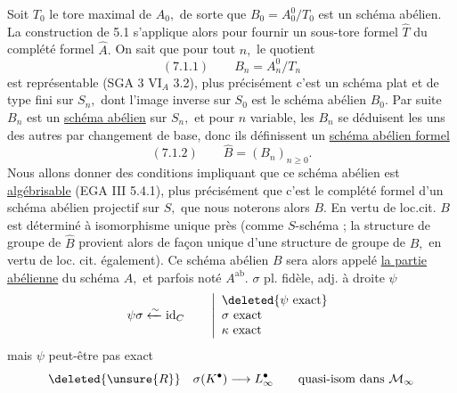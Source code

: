 Soit \(T_0\) le tore maximal de \(A_0,\) de sorte que \(B_0=A_0^0/T_0\) est un schéma abélien. La construction de 5.1 s'applique alors pour fournir un sous-tore formel \(\hat T\) du complété formel \(\hat A.\) On sait que pour tout \(n,\) le quotient
\[
(7.1.1)\qquad B_n=A_n^0/T_n
\]
est représentable (SGA 3 VI\(_A\) 3.2), plus précisément c'est un schéma plat et de type fini sur \(S_n,\) dont l'image inverse sur \(S_0\) est le schéma abélien \(B_0.\) Par suite \(B_n\) est un \uline{schéma abélien} sur \(S_n,\) et pour \(n\) variable, les \(B_n\) se déduisent les uns des autres par changement de base, donc ils définissent un \uline{schéma abélien formel}
\[
(7.1.2)\qquad\hat B=(B_n)_{n\geq0}.
\]
Nous allons donner des conditions impliquant que ce schéma abélien est \uline{algébrisable} (EGA III 5.4.1), plus précisément que c'est le complété formel d'un schéma abélien projectif sur \(S,\) que nous noterons alors \(B.\) En vertu de loc.cit. \(B\) est déterminé à isomorphisme unique près (comme \(S\)-schéma ; la structure de groupe de \(\hat B\) provient alors de façon unique d'une structure de groupe de \(B,\) en vertu de loc. cit. également). Ce schéma abélien \(B\) sera alors appelé \uline{la partie abélienne} du schéma \(A,\) et parfois noté \(A^{\mathrm{ab}}.\)
\(\sigma\) pl. fidèle, adj. à droite \(\psi\)
\[
\psi\sigma\xleftarrow{\sim}\operatorname{id}_C\qquad
\left|\begin{array}{l}\deleted{\psi\text{ exact}}\\\sigma\text{ exact}\\\kappa\text{ exact}\end{array}\right.
\]
mais \(\psi\) peut-être pas exact
\[
\deleted{\unsure{R}}\quad\sigma(K^\bullet)\longrightarrow L^\bullet_\infty\qquad\text{quasi-isom dans }\mathcal M_\infty
\]
